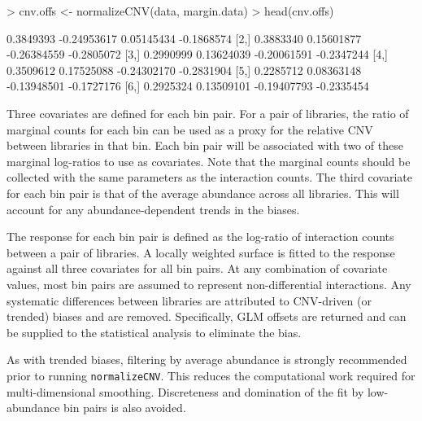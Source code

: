 \documentclass[12pt]{report}
\renewenvironment{Schunk}{\vspace{0pt}}{\vspace{0pt}}
\newcommand{\code}[1]{{\small\texttt{#1}}}
\begin{document}
\begin{Schunk}
\begin{Sinput}
> cnv.offs <- normalizeCNV(data, margin.data)
> head(cnv.offs)
\end{Sinput}
\begin{Soutput}
          [,1]        [,2]        [,3]       [,4]
[1,] 0.3849393 -0.24953617  0.05145434 -0.1868574
[2,] 0.3883340  0.15601877 -0.26384559 -0.2805072
[3,] 0.2990999  0.13624039 -0.20061591 -0.2347244
[4,] 0.3509612  0.17525088 -0.24302170 -0.2831904
[5,] 0.2285712  0.08363148 -0.13948501 -0.1727176
[6,] 0.2925324  0.13509101 -0.19407793 -0.2335454
\end{Soutput}
\end{Schunk}

Three covariates are defined for each bin pair.
For a pair of libraries, the ratio of marginal counts for each bin can be used as a proxy for the relative CNV between libraries in that bin.
Each bin pair will be associated with two of these marginal log-ratios to use as covariates.
Note that the marginal counts should be collected with the same parameters as the interaction counts.
The third covariate for each bin pair is that of the average abundance across all libraries.
This will account for any abundance-dependent trends in the biases.

The response for each bin pair is defined as the log-ratio of interaction counts between a pair of  libraries.
A locally weighted surface is fitted to the response against all three covariates for all bin pairs.
At any combination of covariate values, most bin pairs are assumed to represent non-differential interactions.
Any systematic differences between libraries are attributed to CNV-driven (or trended) biases and are removed.
Specifically, GLM offsets are returned and can be supplied to the statistical analysis to eliminate the bias.

As with trended biases, filtering by average abundance is strongly recommended prior to running \code{normalizeCNV}.
This reduces the computational work required for multi-dimensional smoothing.
Discreteness and domination of the fit by low-abundance bin pairs is also avoided.
\end{document}
